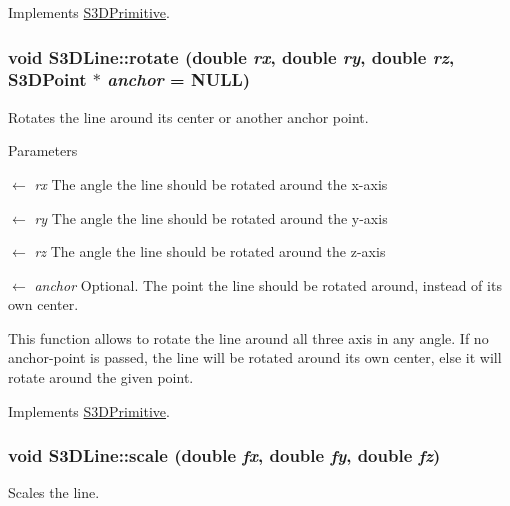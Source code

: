 Implements \hyperlink{class_s3_d_primitive_a73a178ec2e1aa8e95f01baf0552724a9}{S3DPrimitive}.

\hypertarget{class_s3_d_line_a4d23495df2c8f45855d8b80d30b01d30}{
\subsubsection[{rotate}]{\setlength{\rightskip}{0pt plus 5cm}void S3DLine::rotate (double {\em rx}, \/  double {\em ry}, \/  double {\em rz}, \/  {\bf S3DPoint} $\ast$ {\em anchor} = {\ttfamily NULL})}}
\label{class_s3_d_line_a4d23495df2c8f45855d8b80d30b01d30}


Rotates the line around its center or another anchor point. 


\begin{DoxyParams}{Parameters}
\item[\mbox{$\leftarrow$} {\em rx}]The angle the line should be rotated around the x-\/axis \item[\mbox{$\leftarrow$} {\em ry}]The angle the line should be rotated around the y-\/axis \item[\mbox{$\leftarrow$} {\em rz}]The angle the line should be rotated around the z-\/axis \item[\mbox{$\leftarrow$} {\em anchor}]Optional. The point the line should be rotated around, instead of its own center.\end{DoxyParams}
This function allows to rotate the line around all three axis in any angle. If no anchor-\/point is passed, the line will be rotated around its own center, else it will rotate around the given point. 

Implements \hyperlink{class_s3_d_primitive_a23eb36b6bd48643e8f7be4b950592d9e}{S3DPrimitive}.

\hypertarget{class_s3_d_line_a49a646c9b24de7847eb45cac31dd3a27}{
\subsubsection[{scale}]{\setlength{\rightskip}{0pt plus 5cm}void S3DLine::scale (double {\em fx}, \/  double {\em fy}, \/  double {\em fz})}}
\label{class_s3_d_line_a49a646c9b24de7847eb45cac31dd3a27}


Scales the line. 


